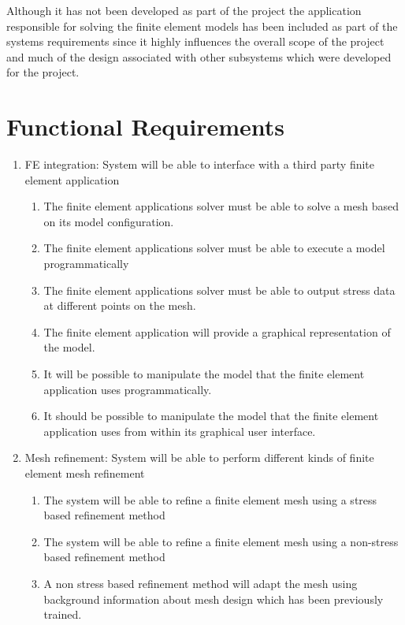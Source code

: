 \noindent
Although it has not been developed as part of the project the application responsible for solving the finite element models has been included as part of the systems requirements since it highly influences the overall scope of the project and much of the design associated with other subsystems which were developed for the project. \\ 

\section{Functional Requirements}

\begin{enumerate}
\item FE integration: System will be able to interface with a third party finite element application

\begin{enumerate}
\item The finite element applications solver must be able to solve a mesh based on its model configuration.
\item The finite element applications solver must be able to execute a model programmatically
\item The finite element applications solver must be able to output stress data at different points on the mesh.
\item The finite element application will provide a graphical representation of the model.
\item It will be possible to manipulate the model that the finite element application uses programmatically.
\item It should be possible to manipulate the model that the finite element application uses from within its graphical user interface.
\end{enumerate}

\item Mesh refinement: System will be able to perform different kinds of finite element mesh refinement

\begin{enumerate}
\item The system will be able to refine a finite element mesh using a stress based refinement method
\item The system will be able to refine a finite element mesh using a non-stress based refinement method

\item A non stress based refinement method will adapt the mesh using background information about mesh design which has been previously trained.


\end{enumerate}
\end{enumerate}
